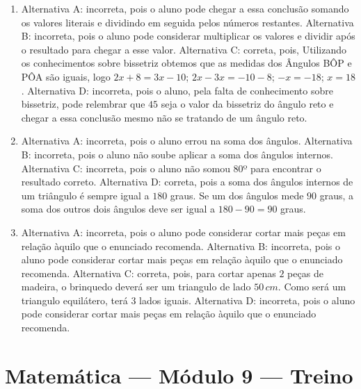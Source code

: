 \begin{enumerate}
\item Alternativa A: incorreta, pois o aluno pode chegar a essa conclusão
somando os valores literais e dividindo em seguida pelos números
restantes.
Alternativa B: incorreta, pois o aluno pode considerar multiplicar os
valores e dividir após o resultado para chegar a esse valor.
Alternativa C: correta, pois, Utilizando os conhecimentos sobre
bissetriz obtemos que as medidas dos Ângulos BÔP e PÔA são iguais, logo $2x+8=3x-10$; $2x-3x= -10 - 8$; $-x = -18$; $x = 18$.
Alternativa D: incorreta, pois o aluno, pela falta de conhecimento sobre
bissetriz, pode relembrar que $45$ seja o valor da bissetriz do ângulo
reto e chegar a essa conclusão mesmo não se tratando de um ângulo reto.

\item Alternativa A: incorreta, pois o aluno errou na soma dos ângulos.
Alternativa B: incorreta, pois o aluno não soube aplicar a soma dos
ângulos internos.
Alternativa C: incorreta, pois o aluno não somou $80$º para encontrar o
resultado correto.
Alternativa D: correta, pois a soma dos ângulos internos de um triângulo
é sempre igual a $180$ graus. Se um dos ângulos mede $90$ graus, a soma dos
outros dois ângulos deve ser igual a $180 - 90 = 90$ graus.

\item Alternativa A: incorreta, pois o aluno pode considerar cortar mais peças
em relação àquilo que o enunciado recomenda.
Alternativa B: incorreta, pois o aluno pode considerar cortar mais peças
em relação àquilo que o enunciado recomenda.
Alternativa C: correta, pois, para cortar apenas $2$ peças de madeira, o
brinquedo deverá ser um triangulo de lado $50\,cm$. Como será um triangulo
equilátero, terá $3$ lados iguais.
Alternativa D: incorreta, pois o aluno pode considerar cortar mais peças
em relação àquilo que o enunciado recomenda.
\end{enumerate}

\section*{Matemática — Módulo 9 — Treino}

